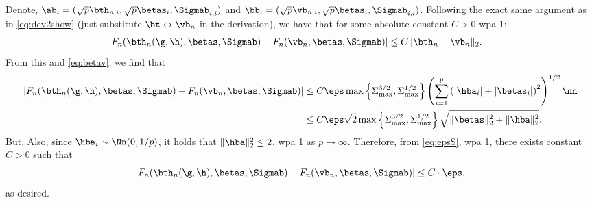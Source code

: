 Denote, $\ab_i=(\sqrt{p}\bth_{n,i},\sqrt{p}\betas_i,\Sigmab_{i,i})$ and $\bb_i=(\sqrt{p}\vb_{n,i},\sqrt{p}\betas_i,\Sigmab_{i,i})$. Following the exact same argument as in \eqref{eq:dev2show} (just substitute $\bt\leftrightarrow\vb_n$ in the derivation), we have that for some absolute constant $C>0$ wpa 1:
\begin{align}
|F_n(\bth_n(\g,\h),\betas,\Sigmab) - F_n(\vb_n,\betas,\Sigmab)| &\leq C \|\bth_n-\vb_n\|_2.
\end{align}
From this and \eqref{eq:betav}, we find that
\begin{align}
|F_n(\bth_n(\g,\h),\betas,\Sigmab) - F_n(\vb_n,\betas,\Sigmab)|
&\leq  
C\eps\max\left\{\Sigma_{\max}^{3/2},\Sigma_{\max}^{1/2} \right\} \left(\sum_{i=1}^p \left(|\hba_i|+|\betas_i|\right)^2\right)^{1/2}\nn
\\
 &\leq 
C\eps\sqrt{2}\max\left\{\Sigma_{\max}^{3/2},\Sigma_{\max}^{1/2}\right\}\sqrt{\|\betas\|_2^2 + \|\hba\|_2^2}.\label{eq:epsS}
\end{align}
But, 
Also, since $\hba_i\sim\Nn(0,1/p)$, it holds that $\|\hba\|_2^2\leq 2$, wpa 1 as $p\rightarrow\infty$. Therefore, from \eqref{eq:epsS}, wpa 1, there exists constant $C>0$ such that 
\begin{align}
|F_n(\bth_n(\g,\h),\betas,\Sigmab) - F_n(\vb_n,\betas,\Sigmab)| \leq C \cdot\eps,
\end{align}
as desired.


